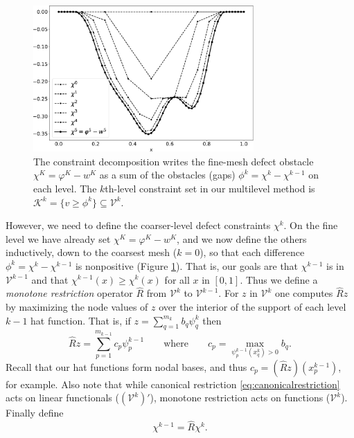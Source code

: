 \documentclass[letterpaper,final,12pt,reqno]{amsart}
\theoremstyle{claim}
\numberwithin{equation}{section}
\numberwithin{figure}{section}
\numberwithin{table}{section}
\begin{document}
\begin{figure}
\includegraphics[width=0.75\textwidth]{fixfigs/decomp_defect.pdf}
\caption{The constraint decomposition writes the fine-mesh defect obstacle $\chi^K = \varphi^K - w^K$ as a sum of the obstacles (gaps) $\phi^k = \chi^k - \chi^{k-1}$ on each level.  The $k$th-level constraint set in our multilevel method is $\mathcal{K}^k = \{v \ge \phi^k\} \subseteq \mathcal{V}^k$.}
\label{fig:gooddecomposition}
\end{figure}

However, we need to define the coarser-level defect constraints $\chi^k$.  On the fine level we have already set $\chi^K = \varphi^K - w^K$, and we now define the others inductively, down to the coarsest mesh ($k=0$), so that each difference $\phi^k = \chi^k - \chi^{k-1}$ is nonpositive (Figure \ref{fig:gooddecomposition}).  That is, our goals are that $\chi^{k-1}$ is in $\mathcal{V}^{k-1}$ and that $\chi^{k-1}(x) \ge \chi^k(x)$ for all $x$ in $[0,1]$.  Thus we define a \emph{monotone restriction} operator $\hat R$ from $\mathcal{V}^k$ to $\mathcal{V}^{k-1}$.  For $z$ in $\mathcal{V}^k$ one computes $\hat R z$ by maximizing the node values of $z$ over the interior of the support of each level $k-1$ hat function.  That is, if $z = \sum_{q=1}^{m_k} b_q \psi_q^k$ then
\begin{equation}
  \hat R z = \sum_{p=1}^{m_{k-1}} c_p \psi_p^{k-1} \qquad \text{where} \qquad c_p = \max_{\psi_p^{k-1}(x_q^k) > 0} b_q.  \label{eq:monotonerestriction}
\end{equation}
Recall that our hat functions form nodal bases, and thus $c_p = (\hat R z)(x_p^{k-1})$, for example.  Also note that while canonical restriction \eqref{eq:canonicalrestriction} acts on linear functionals ($(\mathcal{V}^k)'$), monotone restriction acts on functions ($\mathcal{V}^k$).  Finally define
\begin{equation}
  \chi^{k-1} = \hat R \chi^k.  \label{eq:chik}
\end{equation}
\end{document}
